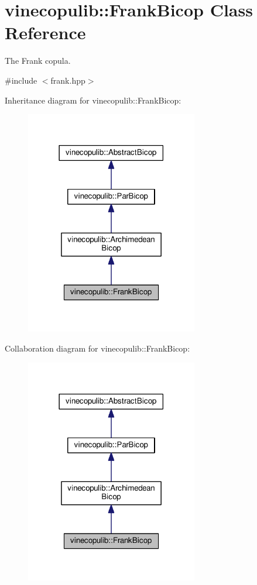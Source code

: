\hypertarget{classvinecopulib_1_1_frank_bicop}{}\section{vinecopulib\+:\+:Frank\+Bicop Class Reference}
\label{classvinecopulib_1_1_frank_bicop}


The Frank copula.  




{\ttfamily \#include $<$frank.\+hpp$>$}



Inheritance diagram for vinecopulib\+:\+:Frank\+Bicop\+:
\nopagebreak
\begin{figure}[H]
\begin{center}
\leavevmode
\includegraphics[width=213pt]{classvinecopulib_1_1_frank_bicop__inherit__graph}
\end{center}
\end{figure}


Collaboration diagram for vinecopulib\+:\+:Frank\+Bicop\+:
\nopagebreak
\begin{figure}[H]
\begin{center}
\leavevmode
\includegraphics[width=213pt]{classvinecopulib_1_1_frank_bicop__coll__graph}
\end{center}
\end{figure}
